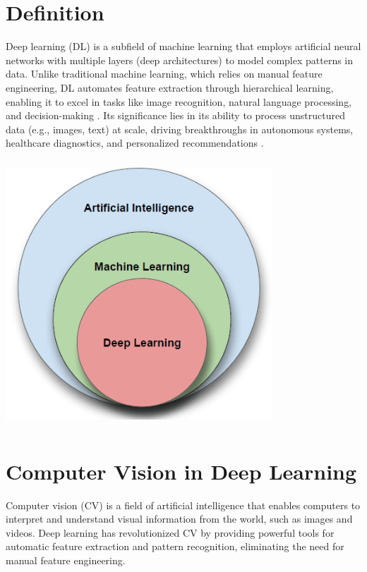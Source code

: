 \documentclass[a4paper,12pt]{report}
\begin{document}
\begin{spacing}{1.5}
    \section{Definition}
    Deep learning (DL) is a subfield of machine learning that employs artificial neural networks with multiple layers (deep architectures) to model complex patterns in data. Unlike traditional machine learning, which relies on manual feature engineering, DL automates feature extraction through hierarchical learning, enabling it to excel in tasks like image recognition, natural language processing, and decision-making \cite{dl}. Its significance lies in its ability to process unstructured data (e.g., images, text) at scale, driving breakthroughs in autonomous systems, healthcare diagnostics, and personalized recommendations \cite{dl2}.

    \begin{minipage}[lH]{0.8\textwidth}
        \centering
        \includegraphics[width=10cm, height=10cm]{Pics/deepLearning.png}
    \end{minipage} 
    
    \vspace{0.5cm}

    \section{Computer Vision in Deep Learning}
    Computer vision (CV) is a field of artificial intelligence that enables computers to interpret and understand visual information from the world, such as images and videos. Deep learning has revolutionized CV by providing powerful tools for automatic feature extraction and pattern recognition, eliminating the need for manual feature engineering.


\end{spacing}
\end{document}
